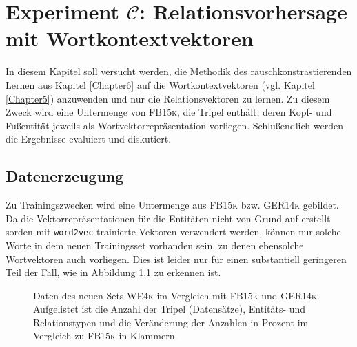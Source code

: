 
\chapter{Experiment $\mathcal{C}$: Relationsvorhersage mit Wortkontextvektoren} %

\label{Chapter8} %


In diesem Kapitel soll versucht werden, die Methodik des rauschkonstrastierenden Lernen aus Kapitel \ref{Chapter6}
auf die Wortkontextvektoren (vgl. Kapitel \ref{Chapter5}) anzuwenden und nur die Relationsvektoren zu lernen. Zu diesem Zweck
wird eine Untermenge von \textsc{FB15k}, die Tripel enthält, deren Kopf- und Fußentität jeweils als Wortvektorrepräsentation vorliegen.
Schlußendlich werden die Ergebnisse evaluiert und diskutiert.

\section{Datenerzeugung}

Zu Trainingszwecken wird eine Untermenge aus \textsc{FB15k} bzw. \textsc{GER14k} gebildet. Da
die Vektorrepräsentationen für die Entitäten nicht von Grund auf erstellt sorden mit
\verb|word2vec| trainierte Vektoren verwendert werden, können nur solche Worte in dem
neuen Trainingsset vorhanden sein, zu denen ebensolche Wortvektoren auch vorliegen.
Dies ist leider nur für einen substantiell geringeren Teil der Fall, wie in Abbildung \ref{fig:we4k} zu
erkennen ist.

\begin{figure}[h]
  \centering
  \begin{changemargin}{0cm}{0cm}
\end{changemargin}
  \caption[Daten des neuen Relationsdatensets im Vergleich zu \textsc{FB15k} und \textsc{GER14k}]{Daten des neuen Sets \textsc{WE4k} im Vergleich mit
  \textsc{FB15k} und \textsc{GER14k}. Aufgelistet ist die Anzahl der Tripel (Datensätze), Entitäts- und Relationstypen und die Veränderung
  der Anzahlen in Prozent im Vergleich zu \textsc{FB15k} in Klammern.\label{fig:we4k}}
\end{figure}

